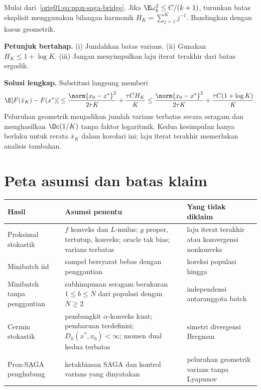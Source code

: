 \begin{exercise}
  \label{orig01:exercise:prox-saga-decay}
  Mulai dari~\eqref{orig01:eq:prox-saga-bridge}. Jika
  $\E\omega_k^2\leq C/(k+1)$, turunkan batas eksplisit menggunakan bilangan
  harmonik $H_K=\sum_{j=1}^{K}j^{-1}$. Bandingkan dengan kasus geometrik.

  \textbf{Petunjuk bertahap.}
  (i) Jumlahkan batas varians.
  (ii) Gunakan $H_K\leq1+\log K$.
  (iii) Jangan menyimpulkan laju iterat terakhir dari batas ergodik.

  \textbf{Solusi lengkap.}
  Substitusi langsung memberi
  \begin{equation}
    \E[F(\bar x_K)-F(x^*)]
    \leq\frac{\norm{x_0-x^*}^2}{2\tau K}
    +\frac{\tau C H_K}{K}
    \leq\frac{\norm{x_0-x^*}^2}{2\tau K}
    +\frac{\tau C(1+\log K)}{K}.
  \end{equation}
  Peluruhan geometrik menjadikan jumlah varians terbatas secara seragam dan
  menghasilkan $\Oc(1/K)$ tanpa faktor logaritmik. Kedua kesimpulan hanya
  berlaku untuk rerata $\bar x_K$ dalam korolari ini; laju iterat terakhir
  memerlukan analisis tambahan.
\end{exercise}

\section{Peta asumsi dan batas klaim}
\label{orig01:section:assumption-map}

\begin{center}
\begin{tabular}{p{}p{}p{}}
\hline
Hasil & Asumsi penentu & Yang tidak diklaim\\
\hline
Proksimal stokastik & $f$ konveks dan $L$-mulus; $g$ proper, tertutup,
konveks; oracle tak bias; varians terbatas & laju iterat terakhir atau
konvergensi nonkonveks\\
Minibatch iid & sampel bersyarat bebas dengan penggantian & koreksi populasi
hingga\\
Minibatch tanpa penggantian & subhimpunan seragam berukuran
$1\leq b\leq N$ dari populasi dengan $N\geq2$ &
independensi antaranggota batch\\
Cermin stokastik & pembangkit $\alpha$-konveks kuat; pembaruan terdefinisi;
$D_h(x^*,x_0)<\infty$; momen dual kedua terbatas & simetri divergensi
Bregman\\
Prox-SAGA penghubung & ketakbiasan SAGA dan kontrol varians yang dinyatakan &
peluruhan geometrik varians tanpa Lyapunov\\
\hline
\end{tabular}
\end{center}

